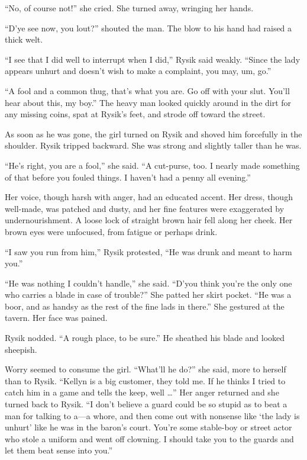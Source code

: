 \documentclass[10pt,b5paper]{article}
\begin{document}
``No, of course not!'' she cried. She turned away, wringing her hands.

``D'ye see now, you lout?'' shouted the man. The blow to his hand
had raised a thick welt.

``I see that I did well to interrupt when I did,'' Rysik said weakly.
``Since the lady appears unhurt and doesn't wish to make a complaint,
you may, um, go.''

``A fool and a common thug, that's what you are. Go off with your
slut. You'll hear about this, my boy.'' The heavy man looked quickly
around in the dirt for any missing coins, spat at Rysik's feet,
and strode off toward the street.

As soon as he was gone, the girl turned on Rysik and shoved him
forcefully in the shoulder. Rysik tripped backward. She was strong
and slightly taller than he was.

``He's right, you are a fool,'' she said. ``A cut-purse, too. I nearly
made something of that before you fouled things. I haven't had a
penny all evening.''

Her voice, though harsh with anger, had an educated accent. Her
dress, though well-made, was patched and dusty, and her fine features
were exaggerated by undernourishment. A loose lock of straight
brown hair fell along her cheek. Her brown eyes were unfocused,
from fatigue or perhaps drink.

``I saw you run from him,'' Rysik protested, ``He was drunk and meant
to harm you.''

``He was nothing I couldn't handle,'' she said. ``D'you think you're
the only one who carries a blade in case of trouble?'' She patted
her skirt pocket. ``He was a boor, and as handsy as the rest of the
fine lads in there.'' She gestured at the tavern. Her face was pained.

Rysik nodded. ``A rough place, to be sure.'' He sheathed his blade
and looked sheepish.

Worry seemed to consume the girl. ``What'll he do?'' she said,
more to herself than to Rysik. ``Kellyn is a big customer, they told
me. If he thinks I tried to catch him in a game and tells the keep,
well \ldots'' Her anger returned and she turned back to Rysik. ``I don't
believe a guard could be so stupid as to beat a man for talking to
a---a whore, and then come out with nonsense like `the lady is unhurt'
like he was in the baron's court. You're some stable-boy or street
actor who stole a uniform and went off clowning. I should take you
to the guards and let them beat sense into you.''
\end{document}
